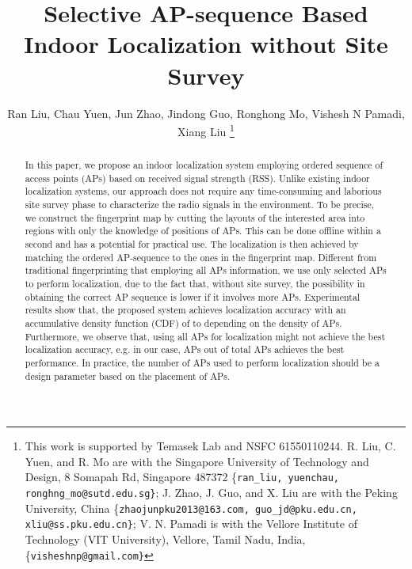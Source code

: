 \documentclass[10pt, conference, letterpaper]{IEEEtran}
\begin{document}
\IEEEoverridecommandlockouts
\title{Selective AP-sequence Based Indoor Localization without Site Survey}


\author{Ran Liu, Chau Yuen, Jun Zhao, Jindong Guo, Ronghong Mo, Vishesh N Pamadi, Xiang Liu
\thanks{This work is supported by Temasek Lab and NSFC 61550110244. \newline
R. Liu, C. Yuen, and R. Mo are with the Singapore University of Technology and Design, 8 Somapah Rd, Singapore 487372
{\{\tt\small ran\_liu, yuenchau, ronghng\_mo@sutd.edu.sg\}}; J. Zhao, J. Guo, and X. Liu are with the Peking University, China
{\{\tt\small  zhaojunpku2013@163.com, guo\_jd@pku.edu.cn, xliu@ss.pku.edu.cn\}};
V. N. Pamadi is with the Vellore Institute of Technology (VIT University), Vellore, Tamil Nadu, India,
{\{\tt\small  visheshnp@gmail.com\}}
}}



\maketitle

\begin{abstract}
In this paper, we propose an indoor localization system employing ordered sequence of access points (APs) based on received signal strength (RSS). 
Unlike existing indoor localization systems, our approach does not require any time-consuming and laborious site survey phase to characterize the radio signals in the environment. 
To be precise, we construct the fingerprint map by cutting the layouts of the interested area into regions with only the knowledge of positions of APs. 
This can be done offline within a second and has a potential for practical use. 
The localization is then achieved by matching the ordered AP-sequence to the ones in the fingerprint map.
Different from traditional fingerprinting that employing all APs information, 
we use only selected APs to perform localization, due to the fact that, without site survey, 
the possibility in obtaining the correct AP sequence is lower if it involves more APs.
Experimental results show that, the proposed system achieves localization accuracy  with an accumulative density function (CDF) of  to  depending on the density of APs. 
Furthermore, we observe that, using all APs for localization might not achieve the best localization accuracy, e.g. in our case,  APs out of total  APs achieves the best performance. 
In practice, the number of APs used to perform localization should be a design parameter based on the placement of APs.
\end{abstract}
\end{document}
